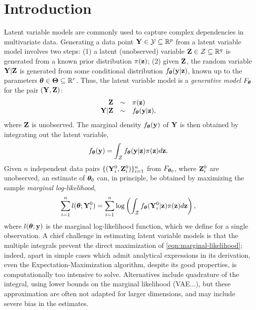 \documentclass[twoside,11pt]{article}
\newcommand{\jb}[2][]{\todo[color=jbcolor, caption={JB}, #1]{#2}}
\begin{document}
\section{Introduction}
 Latent variable models are commonly used to capture complex dependencies in multivariate data. Generating a data point ${\bf Y}\in \mathcal Y \subseteq \mathbb R^p$ from a latent variable model  involves two steps: (1) a latent (unobserved) variable ${\bf Z}\in \mathcal Z \subseteq\mathbb R^q$ is generated from a known prior distribution $\pi({\bf z})$; (2) given ${\bf Z}$, the random variable ${\bf Y}|{\bf Z}$ is generated from some conditional distribution $f_{\bm{\theta}}({\bf y}|{\bf z})$, known up to the parameters ${\bm{\theta}}\in\bm\Theta\subseteq \mathbb R^r$\jb{Does it work for nonparametric?}. Thus, the latent variable model is a \textit{generative model} $F_{\bm{\theta}}$ for the pair $({\bf Y}, {\bf Z})$:
%
\begin{align}
    \begin{matrix}
        \hfill\Z &\sim& \pi(\z)\hfill\\
        \hfill\Y|\Z &\sim& f_\bt(\y|\z)\hfill,
    \end{matrix}
    \label{eqn:generative-model-general}
\end{align}
%
where ${\bf Z}$ is unobserved.
% 
The marginal density $f_{\bm{\theta}}({\bf y})$ of ${\bf Y}$ is then obtained by integrating out the latent variable, 
%
\begin{equation}
    f_{\bm{\theta}}({\bf y}) = \int_{\mathcal Z} f_{\bm{\theta}}({\bf y}|{\bf z})\pi({\bf z})d{\bf z}.
\end{equation}
Given $n$ independent data pairs $\{({\bf Y}_i^0, {\bf Z}_i^0)\}_{i=1}^n$ from $F_{{\bm{\theta}}_0}$, where ${\bf Z}_i^0$ are unobserved, an estimate of ${\bm{\theta}}_0$ can, in principle, be obtained by maximizing the sample \textit{marginal log-likelihood}, 
%
\begin{equation}
\sum_{i=1}^n l({\bm{\theta}}; {\bf Y}_{i}^0)= \sum_{i=1}^n \log\left(\int_{\mathcal Z}f_{\bm{\theta}}({\bf Y}_{i}^0|{\bf z})\pi({\bf z})d{\bf z}\right),
    \label{eqn:marginal-likelihood}
\end{equation}
%
where $l({\bm{\theta}}; {\bf y})$ is the marginal log-likelihood function, which we define for a single observation.
A chief challenge in estimating latent variable models is that the multiple integrals prevent the direct maximization of \eqref{eqn:marginal-likelihood}; indeed, apart in simple cases which admit analytical expressions in its derivation, even the Expectation-Maximization algorithm, despite its good properties, is computationally too intensive to solve. Alternatives include quadrature of the integral, using lower bounds on the marginal likelihood (VAE...), but these approximation are often not adapted for larger dimensions, and may include severe bias in the estimates.
\end{document}
